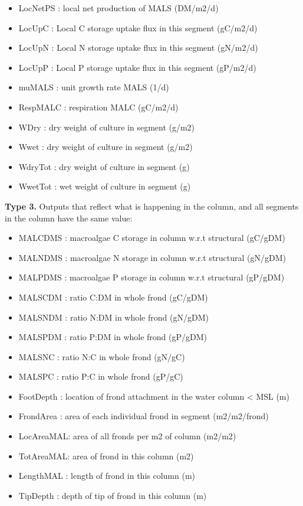 \documentclass{deltares_manual}
\begin{document}
\begin{itemize}
	\item LocNetPS : local net production of MALS                            (DM/m2/d) 
	\item LocUpC   : Local C storage uptake flux in this segment             (gC/m2/d) 
	\item LocUpN   : Local N storage uptake flux in this segment             (gN/m2/d) 
	\item LocUpP   : Local P storage uptake flux in this segment             (gP/m2/d) 
	\item muMALS   : unit growth rate MALS                                   (1/d) 
	\item RespMALC : respiration MALC                                        (gC/m2/d)         
	\item WDry     : dry weight of culture in segment                        (g/m2) 
	\item Wwet     : dry weight of culture in segment                        (g/m2) 
	\item WdryTot  : dry weight of culture in segment                        (g) 
	\item WwetTot  : wet weight of culture in segment                        (g)  
\end{itemize}

\textbf{Type 3.} Outputs that reflect what is happening in the column, and all segments in the column have the same value:
\begin{itemize}
	\item MALCDMS   : macroalgae C storage in column w.r.t structural        (gC/gDM)
	\item MALNDMS   : macroalgae N storage in column w.r.t structural        (gN/gDM)
	\item MALPDMS   : macroalgae P storage in column w.r.t structural        (gP/gDM) 
	\item MALSCDM   : ratio C:DM in whole frond                               (gC/gDM) 
	\item MALSNDM   : ratio N:DM in whole frond                               (gN/gDM) 
	\item MALSPDM   : ratio P:DM in whole frond                               (gP/gDM) 
	\item MALSNC    : ratio N:C in whole frond                                (gN/gC) 
	\item MALSPC    : ratio P:C in whole frond                                (gP/gC) 	
	\item FootDepth : location of frond attachment in the water column < MSL (m)   
	\item FrondArea : area of each individual frond in segment               (m2/m2/frond)    
	\item LocAreaMAL: area of all fronds per m2 of column                    (m2/m2)          
	\item TotAreaMAL: area of frond in this column                           (m2) 
	\item LengthMAL : length of frond in this column                         (m)  
	\item TipDepth  : depth of tip of frond in this column                   (m)  
\end{itemize}
\end{document}
